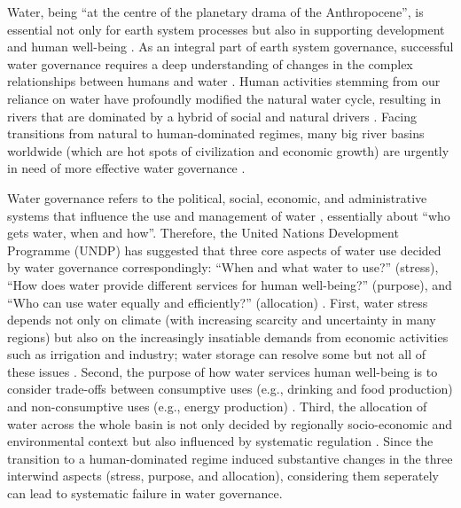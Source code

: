 \label{Intro.}
Water, being ``at the centre of the planetary drama of the Anthropocene'', is essential not only for earth system processes but also in supporting development and human well-being
\cite{gleeson2020a,gleeson2020b}.
As an integral part of earth system governance, successful water governance requires a deep understanding of changes in the complex relationships between humans and water
\cite{ahlstrom2021,biermann2012,steffen2020}.
Human activities stemming from our reliance on water have profoundly modified the natural water cycle, resulting in rivers that are dominated by a hybrid of social and natural drivers
\cite{sivapalan2012,qin2014,abbott2019}.
Facing transitions from natural to human-dominated regimes, many big river basins worldwide (which are hot spots of civilization and economic growth) are urgently in need of more effective water governance
\cite{best2019,dibaldassarre2019}.

Water governance refers to the political, social, economic, and administrative systems that influence the use and management of water \cite{oecd2018, wang2017}, essentially about ``who gets water, when and how''\cite{lasswell2018}.
Therefore, the United Nations Development Programme (UNDP) has suggested that three core aspects of water use decided by water governance correspondingly: ``When and what water to use?'' (stress), ``How does water provide different services for human well-being?'' (purpose), and ``Who can use water equally and efficiently?'' (allocation)
\cite{undpwatergovernancefacility2016}.
First, water stress depends not only on climate (with increasing scarcity and uncertainty in many regions) but also on the increasingly insatiable demands from economic activities such as irrigation and industry; water storage can resolve some but not all of these issues
\cite{qin2019,wada2014,huang2021}.
Second, the purpose of how water services human well-being is to consider trade-offs between consumptive uses (e.g., drinking and food production) and non-consumptive uses (e.g., energy production)
\cite{liu2017,florke2018,jaeger2019}.
Third, the allocation of water across the whole basin is not only decided by regionally socio-economic and environmental context but also influenced by systematic regulation
\cite{schmandt2021,speed2013}.
Since the transition to a human-dominated regime induced substantive changes in the three interwind aspects (stress, purpose, and allocation), considering them seperately can lead to systematic failure in water governance.

